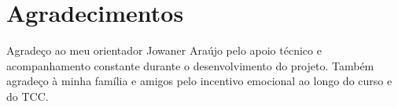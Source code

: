 \section*{Agradecimentos}
    Agradeço ao meu orientador Jowaner Araújo pelo apoio técnico e acompanhamento constante durante o desenvolvimento do projeto. Também agradeço à minha família e amigos pelo incentivo emocional ao longo do curso e do TCC.
